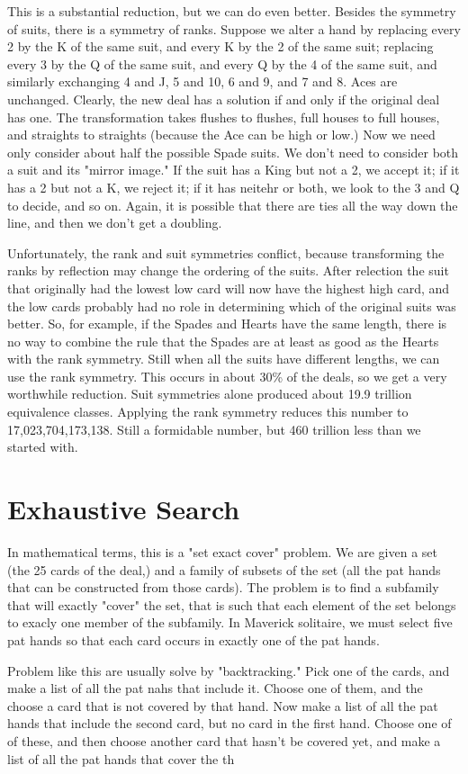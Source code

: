 \documentclass [12pt, letterpaper] {article}
\begin{document}
This is a substantial reduction, but we can do even better.  Besides the symmetry of suits, there is a symmetry of ranks.
Suppose we alter a hand by replacing every 2 by the K of the same suit, and every K by the 2 of the same suit; replacing
every 3 by the Q of the same suit, and every Q by the 4 of the same suit, and similarly exchanging 4 and J, 5 and 10, 6 and 9, and 7 and 8.
Aces are unchanged.  Clearly, the new deal has a solution if and only if the original deal has one.  The transformation takes flushes to 
flushes, full houses to full houses, and straights to straights (because the Ace can be high or low.)  
Now we need only consider about half the possible Spade suits.  We don't need to consider both a
suit and its "mirror image."  If the suit has a King but not a 2, we accept it; if it has a 2 but not a K, we reject it; if it has neitehr or both, 
we look to the 3 and Q to decide, and so on.  Again, it is possible that there are ties all the way down the line, and then we 
don't get a doubling.

Unfortunately, the rank and suit symmetries conflict, because transforming the ranks by reflection may change the ordering of the suits.  After relection
the suit that originally had the lowest low card will now have the highest high card, and the low cards probably had no role in determining
which of the original suits was better.  So, for example, if the Spades and Hearts have the same length, there is no way to combine the rule 
that the Spades are at least as good as the Hearts with the rank symmetry.  Still when all the suits have different lengths, we can use the rank symmetry.
This occurs in about 30\% of the deals, so we get a very worthwhile reduction.  Suit symmetries alone produced about 19.9 trillion equivalence 
classes.  Applying the rank symmetry reduces this number to 17,023,704,173,138.  Still a formidable number, but 460 trillion less than we started with.

\section{Exhaustive Search}

In mathematical terms, this is a "set exact cover" problem.  We are given a set (the 25 cards of the deal,) 
and a family of subsets of the set (all the pat hands that can be constructed from those cards).  The problem is 
to find a subfamily that will exactly "cover" the set, that is such that each element of the set belongs to exacly 
one member of the subfamily.  In Maverick solitaire, we must select five pat hands so that each card occurs 
in exactly one of the pat hands.

Problem like this are usually solve by "backtracking."  Pick one of the cards, and make a list of all the pat
nahs that include it.  Choose one of them, and the choose a card that is not covered by that hand.  Now make a
list of all the pat hands that include the second card, but no card in the first hand.  Choose one of of these,
and then choose another card that hasn't be covered yet, and make a list of all the pat hands that cover the th 
\end{document}
